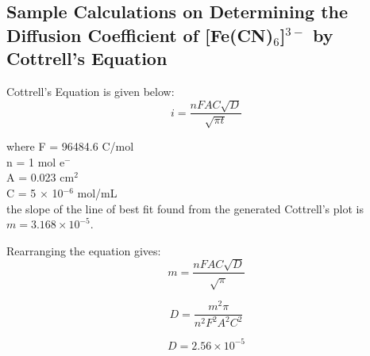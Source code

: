 \documentclass{article}
\begin{document}
\begin{center}
\newpage 
\subsection*{Sample Calculations on Determining the Diffusion Coefficient
of [Fe(CN)$_6$]$^{3-}$ by Cottrell's Equation}
\vspace{2cm}

Cottrell's Equation is given below:
\begin{equation*}
    i = \frac{nFAC\sqrt{D}}{\sqrt{\pi t}} 
\end{equation*}

where F = 96484.6 C/mol \\
    n = 1 mol e$^-$ \\
    A = 0.023 cm$^2$ \\
    C = 5 $\times$ 10$^{-6}$ mol/mL \\
\vspace{1cm}
the slope of the line of best fit found from the generated Cottrell's plot is $m = 3.168 \times
    10^{-5}$.

Rearranging the equation gives:
    \begin{equation*}
        m = \frac{nFAC\sqrt{D}}{\sqrt{\pi}}
    \end{equation*}

    \begin{equation*}
        D = \frac{m^2 \pi}{n^2F^2A^2C^2}
    \end{equation*}

    \begin{equation*}
        D = 2.56 \times 10^{-5}
    \end{equation*}

\end{center}
\end{document}
